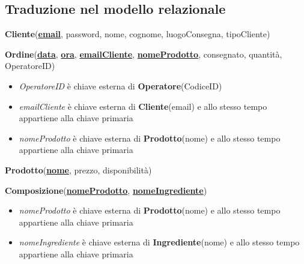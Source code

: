 \documentclass[12pt,a4paper]{article}
\begin{document}
    \newpage
    \subsection{Traduzione nel modello relazionale}
    \begin{tcolorbox}[
        colback=gray!8,
        colframe=black!30,
        title=
    ]
        \textbf{Cliente}(\textbf{\uline{email}}, password, nome, cognome, luogoConsegna, tipoCliente)
    \end{tcolorbox}

    \begin{tcolorbox}[
        colback=gray!8,
        colframe=black!30,
        title=
    ]
        \textbf{Ordine}(\uline{\textbf{data}}, \textbf{\uline{ora}}, \textbf{\uline{emailCliente}}, \textbf{\uline{nomeProdotto}}, consegnato, quantità, OperatoreID)
        \begin{itemize}[leftmargin=1em]
            \item \textit{OperatoreID} è chiave esterna di \textbf{Operatore}(CodiceID)
            \item \textit{emailCliente} è chiave esterna di \textbf{Cliente}(email) e allo stesso tempo appartiene alla chiave primaria
            \item \textit{nomeProdotto} è chiave esterna di \textbf{Prodotto}(nome) e allo stesso tempo appartiene alla chiave primaria
        \end{itemize}
    \end{tcolorbox}
    
    \begin{tcolorbox}[
        colback=gray!8,
        colframe=black!30,
        title=
    ]
        \textbf{Prodotto}(\textbf{\uline{nome}}, prezzo, disponibilità)
    \end{tcolorbox}

    \begin{tcolorbox}[
        colback=gray!8,
        colframe=black!30,
        title=
    ]
        \textbf{Composizione}(\textbf{\uline{nomeProdotto}}, \textbf{\uline{nomeIngrediente}})
        \begin{itemize}[leftmargin=1em]
            \item \textit{nomeProdotto} è chiave esterna di \textbf{Prodotto}(nome) e allo stesso tempo appartiene alla chiave primaria
            \item \textit{nomeIngrediente} è chiave esterna di \textbf{Ingrediente}(nome) e allo stesso tempo appartiene alla chiave primaria
        \end{itemize}
    \end{tcolorbox}
\end{document}
